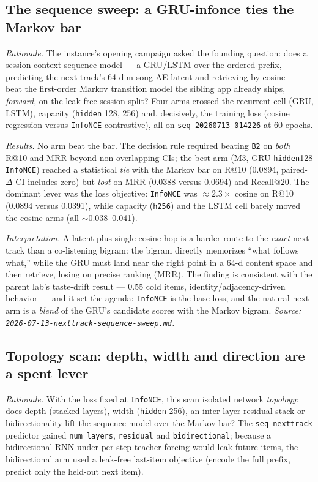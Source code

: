 \documentclass[11pt]{article}
\newcommand{\dsid}[1]{\texttt{\small #1}}
\begin{document}
\subsection{The sequence sweep: a GRU-infonce ties the Markov bar}
\label{sec:nexttrack-sweep}
\emph{Rationale.} The instance's opening campaign asked the founding question:
does a session-context sequence model --- a GRU/LSTM over the ordered prefix,
predicting the next track's 64-dim song-AE latent and retrieving by cosine ---
beat the first-order Markov transition model the sibling app already ships,
\emph{forward}, on the leak-free session split? Four arms crossed the recurrent
cell (GRU, LSTM), capacity (\texttt{hidden} 128, 256) and, decisively, the
training loss (cosine regression versus \texttt{InfoNCE} contrastive), all on
\dsid{seq-20260713-014226} at 60 epochs.

\emph{Results.} No arm beat the bar. The decision rule required beating
\texttt{B2} on \emph{both} R@10 and MRR beyond non-overlapping CIs; the best arm
(M3, GRU \texttt{hidden}128 \texttt{InfoNCE}) reached a statistical \emph{tie}
with the Markov bar on R@10 (\num{0.0894}, paired-$\Delta$ CI includes zero) but
\emph{lost} on MRR (\num{0.0388} versus \num{0.0694}) and Recall@20. The
dominant lever was the loss objective: \texttt{InfoNCE} was $\approx 2.3\times$
cosine on R@10 (\num{0.0894} versus \num{0.0391}), while capacity (\texttt{h256})
and the LSTM cell barely moved the cosine arms (all $\sim$0.038--0.041).

\emph{Interpretation.} A latent-plus-single-cosine-hop is a harder route to the
\emph{exact} next track than a co-listening bigram: the bigram directly
memorizes ``what follows what,'' while the GRU must land near the right point in
a 64-d content space and then retrieve, losing on precise ranking (MRR). The
finding is consistent with the parent lab's taste-drift result --- \num{0.55}
cold items, identity/adjacency-driven behavior --- and it set the agenda:
\texttt{InfoNCE} is the base loss, and the natural next arm is a \emph{blend} of
the GRU's candidate scores with the Markov bigram.
\emph{Source: \texttt{2026-07-13-nexttrack-sequence-sweep.md}.}

\subsection{Topology scan: depth, width and direction are a spent lever}
\label{sec:nexttrack-topology}
\emph{Rationale.} With the loss fixed at \texttt{InfoNCE}, this scan isolated
network \emph{topology}: does depth (stacked layers), width (\texttt{hidden}
256), an inter-layer residual stack or bidirectionality lift the sequence model
over the Markov bar? The \texttt{seq-nexttrack} predictor gained
\texttt{num\_layers}, \texttt{residual} and \texttt{bidirectional}; because a
bidirectional RNN under per-step teacher forcing would leak future items, the
bidirectional arm used a leak-free last-item objective (encode the full prefix,
predict only the held-out next item).
\end{document}
